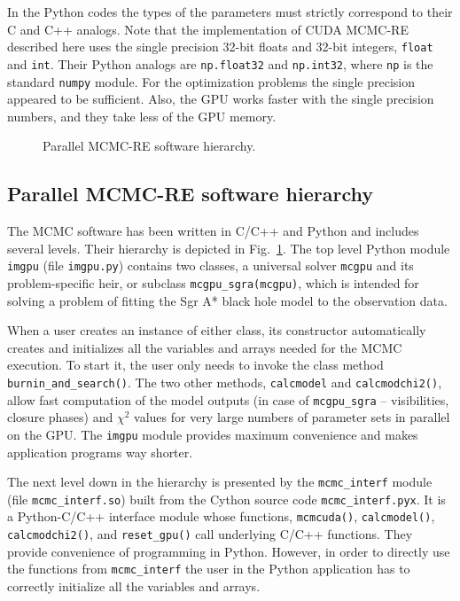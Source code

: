 \documentclass[preprint2]{aastex}
\begin{document}
In the Python codes the types of the parameters must strictly correspond to 
their  C and C++ analogs. Note that the implementation of CUDA MCMC-RE described
here uses the single precision 32-bit floats and 32-bit integers, \verb|float| 
and \verb|int|. Their Python analogs are \verb|np.float32| and \verb|np.int32|, 
where \verb|np| is the standard \verb|numpy| module. For the optimization problems 
the single precision appeared to be sufficient. Also, the GPU works faster with the 
single precision numbers, and they take less of the GPU memory.


\begin{figure}[ht!]    %
\caption{\small Parallel MCMC-RE software hierarchy.
\label{mcmc_soft_hierarchy}}
\end{figure}



\subsection{Parallel MCMC-RE software hierarchy}

The MCMC software has been written in C/C++ and Python and includes several levels. Their hierarchy is depicted in Fig.~\ref{mcmc_soft_hierarchy}. The top level Python module \verb|imgpu| (file \verb|imgpu.py|) contains two classes, a universal solver \verb|mcgpu| and its problem-specific heir, or subclass \verb|mcgpu_sgra(mcgpu)|, which is intended for solving a problem of fitting the Sgr A* black hole model to the observation data. 

When a user creates an instance of either class, its constructor automatically creates and initializes all the variables and arrays needed for the MCMC execution. To start it, the user only needs to invoke the class method \verb|burnin_and_search()|. The two other methods, \verb|calcmodel| and \verb|calcmodchi2()|, allow fast computation of the model outputs (in case of \verb|mcgpu_sgra| -- visibilities, closure phases) and $\chi^2$ values for very large numbers of parameter sets in parallel on the GPU. The \verb|imgpu| module provides maximum convenience and makes application programs way shorter.

The next level down in the hierarchy is presented by the \verb|mcmc_interf| module (file  \verb|mcmc_interf.so|) built from the Cython source code \verb|mcmc_interf.pyx|. It is a Python-C/C++ interface module whose functions, \verb|mcmcuda()|,   \verb|calcmodel()|,   \verb|calcmodchi2()|, and  \verb|reset_gpu()| call underlying C/C++ functions. They provide convenience of programming in Python. However, in order to directly use the functions from \verb|mcmc_interf| the user in the Python application has to correctly initialize all the variables and arrays.  
\end{document}
